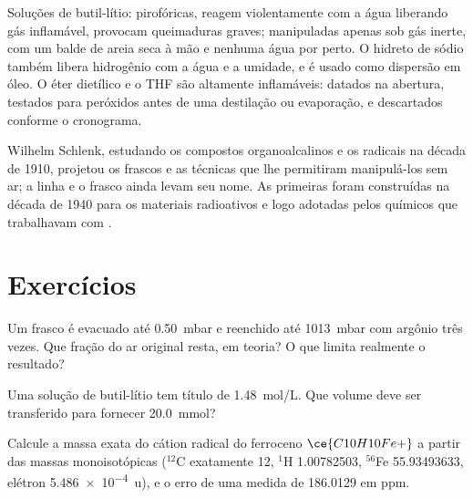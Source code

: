 \begin{safety}{}
Soluções de butil-lítio: pirofóricas, reagem violentamente com a água liberando
gás inflamável, provocam queimaduras graves; manipuladas apenas sob gás inerte, com um balde de
areia seca à mão e nenhuma água por perto. O hidreto de sódio também libera
hidrogênio com a água e a umidade, e é usado como dispersão em óleo. O éter
dietílico e o THF são  altamente inflamáveis: datados na abertura, testados para
peróxidos antes de uma destilação ou evaporação, e descartados conforme o cronograma.
\end{safety}

\begin{history}
Wilhelm Schlenk, estudando os compostos organoalcalinos e os radicais na década de 1910,
projetou os frascos e as técnicas que lhe permitiram manipulá-los sem ar; a
linha e o frasco ainda levam seu nome. As primeiras  foram construídas na
década de 1940 para os materiais radioativos e logo adotadas pelos químicos que trabalhavam com
.
\end{history}

\section{Exercícios}

\begin{exercise}[$\star$]\label{exo:b3:lab-techniques-3:1}
Um frasco é evacuado até \qty{0.50}{mbar} e reenchido até \qty{1013}{mbar} com argônio três vezes. Que fração do
ar original resta, em teoria? O que limita realmente o resultado?
\end{exercise}

\begin{exercise}[$\star$]\label{exo:b3:lab-techniques-3:2}
Uma solução de butil-lítio tem título de \qty{1.48}{mol/L}. Que volume deve ser transferido para fornecer
\qty{20.0}{mmol}?
\end{exercise}

\begin{exercise}[$\star$]\label{exo:b3:lab-techniques-3:3}
Calcule a massa exata do cátion radical do ferroceno $\ce{C10H10Fe+}$ a partir das massas monoisotópicas
($^{12}$C exatamente 12, $^1$H 1.00782503, $^{56}$Fe 55.93493633, elétron \qty{5.486e-4}{u}), e o erro de uma medida de
186.0129 em ppm.
\end{exercise}

